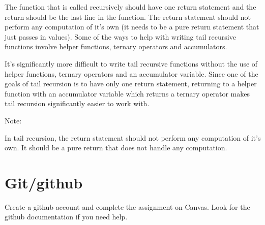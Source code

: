 \documentclass[11pt,a4paper,english]{paper}
\begin{document}
The function that is called recursively should have one return statement and the return should be the last line in the function. The return statement should not perform any computation of it's own (it needs to be a pure return statement that just passes in values). Some of the ways to help with writing tail recursive functions involve helper functions, ternary operators and accumulators. 

\bigskip
\bigskip
\noindent It's significantly more difficult to write tail recursive functions without the use of helper functions, ternary operators and an accumulator variable. Since one of the goals of tail recursion is to have only one return statement, returning to a helper function with an accumulator variable which returns a ternary operator makes tail recursion significantly easier to work with.

\begin{mybox}{Note:} {

  In tail recursion, the return statement should not perform any computation of it's own. It should be a pure return that does not handle any computation.

}\end{mybox}


\section{Git/github}

Create a github account and complete the assignment on Canvas. Look for the github documentation if you need help.
\end{document}
